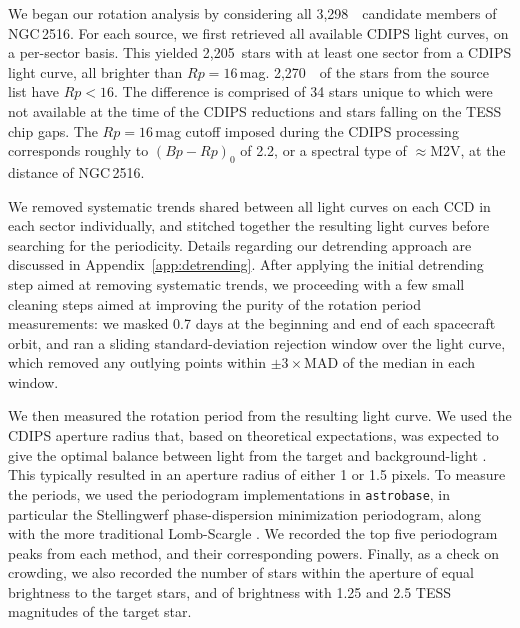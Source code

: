 \documentclass[12pt,twocolumn,tighten]{aastex63}
\newcommand{\cn}{NGC\,2516} %
\newcommand{\nkinematic}{3{,}298\ } %
\newcommand{\ncdips}{2{,}205\ }
\newcommand{\nkinematicrpltsixteen}{2{,}270\ }
\begin{document}
We began our rotation analysis by considering all \nkinematic\
candidate members of \cn.  For each source, we first retrieved all
available CDIPS light curves, on a per-sector basis.  This yielded
\ncdips stars with at least one sector from a CDIPS light curve, all
brighter than $Rp=16$\,mag.  \nkinematicrpltsixteen\ of the stars from
the source list have $Rp<16$.  The difference is comprised of 34 stars
unique to \citet{meingast_2021} which were not available at the time
of the CDIPS reductions and stars falling on the TESS chip gaps.  The
$Rp=16$\,mag cutoff imposed during the CDIPS processing corresponds
roughly to $(Bp-Rp)_0$ of 2.2, or a spectral type of $\approx$M2V, at
the distance of NGC\,2516.

We removed systematic trends shared between all light curves on each
CCD in each sector individually, and stitched together the resulting
light curves before searching for the periodicity.  Details regarding
our detrending approach are discussed in
Appendix~\ref{app:detrending}.  After applying the initial detrending
step aimed at removing systematic trends, we proceeding with a few
small cleaning steps aimed at improving the purity of the rotation
period measurements: we masked 0.7 days at the beginning and end of
each spacecraft orbit, and ran a sliding standard-deviation rejection
window over the light curve, which removed any outlying points within
$\pm3\times$MAD of the median in each window.

We then measured the rotation period from the resulting light curve.
We used the CDIPS aperture radius that, based on theoretical
expectations, was expected to give the optimal balance between light
from the target and background-light \citep{Sullivan_2015}.  This
typically resulted in an aperture radius of either 1 or 1.5 pixels.
To measure the periods, we used the periodogram implementations in
\texttt{astrobase}, in particular the Stellingwerf phase-dispersion
minimization periodogram, along with the more traditional Lomb-Scargle
\citep{lomb_1976,stellingwerf_period_1978,scargle_studies_1982,stellingwerf_period_2011,bhatti_astrobase_2018}.
We recorded the top five periodogram peaks from each method, and their
corresponding powers.  Finally, as a check on crowding, we also
recorded the number of stars within the aperture of equal brightness
to the target stars, and of brightness with 1.25 and 2.5 TESS
magnitudes of the target star.
\end{document}
